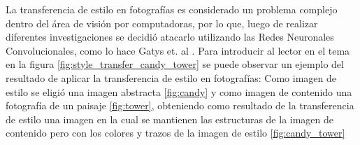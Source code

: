 \documentclass[a4paper,11pt,spanish]{book}
\begin{document}
    La transferencia de estilo en fotografías es considerado un problema complejo dentro del área de visión por computadoras, por lo que, luego de realizar diferentes 
    investigaciones se decidió atacarlo utilizando las Redes Neuronales Convolucionales, como lo hace Gatys et. al \cite{Gatys:Neural_Style}.
    Para introducir al lector en el tema en la figura \ref{fig:style_transfer_candy_tower} se puede observar un ejemplo del resultado de aplicar la transferencia de estilo en fotografías:
    Como imagen de estilo se eligió una imagen abstracta \ref{fig:candy} y como imagen de contenido una fotografía de un paisaje \ref{fig:tower}, obteniendo como resultado de la
    transferencia de estilo una imagen en la cual se mantienen las estructuras de la imagen de contenido pero con los colores y trazos de la imagen de estilo \ref{fig:candy_tower}
    \begin{figure}[h]
      \begin{center}
	\\
	\\ 

\end{center}
\end{figure}
\end{document}
